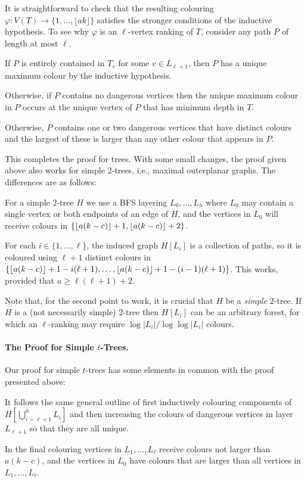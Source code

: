 \documentclass[kpfonts]{patmorin}
\theoremstyle{named}
\begin{document}
It is straightforward to check that the resulting colouring $\varphi:V(T)\to\{1,\ldots,\lfloor ak\rfloor\}$ satisfies the stronger conditions of the inductive hypothesis.  To see why $\varphi$ is an $\ell$-vertex ranking of $T$, consider any path $P$ of length at most $\ell$.
\begin{compactitem}
  \item If $P$ is entirely contained in $T_v$ for some $v\in L_{\ell+1}$, then $P$ has a unique maximum colour by the inductive hypothesis.

  \item Otherwise, if $P$ contains no dangerous vertices then the unique maximum colour in $P$ occurs at the unique vertex of $P$ that has minimum depth in $T$.

  \item Otherwise, $P$ contains one or two dangerous vertices that have distinct colours and the largest of these is larger than any other colour that appears in $P$.
\end{compactitem}
This completes the proof for trees.  With some small changes, the proof given above also works for simple $2$-trees, i.e., maximal outerplanar graphs.  The differences are as follows:
\begin{compactitem}
    \item For a simple $2$-tree $H$ we use a BFS layering $L_0,\ldots,L_h$ where $L_0$ may contain a single vertex or both endpoints of an edge of $H$, and the  vertices in $L_0$ will receive colours in $\{{\lfloor a(k-c) \rfloor}+1,{\lfloor a(k-c) \rfloor}+2\}$.

    \item For each $i\in\{1,\ldots,\ell\}$, the induced graph $H[L_i]$ is a collection of paths, so it is coloured using $\ell+1$ distinct colours in $\{{\lfloor a(k-c) \rfloor}+1-i(\ell+1),\ldots,{\lfloor a(k-c) \rfloor}+1-(i-1)(\ell+1)\}$.  This works, provided that $a\ge\ell(\ell+1) + 2$.
\end{compactitem}
Note that, for the second point to work, it is crucial that $H$ be a \emph{simple} $2$-tree.  If $H$ is a (not necessarily simple) $2$-tree then $H[L_i]$ can be an arbitrary forest, for which an $\ell$-ranking may require $\log|L_i|/\log\log|L_i|$ colours.

\paragraph{The Proof for Simple $t$-Trees.}

Our proof for simple $t$-trees has some elements in common with the proof presented above:
\begin{compactitem}
  \item It follows the same general outline of first inductively colouring components of $H[\bigcup_{i=\ell+1}^{h} L_i]$ and then increasing the colours of dangerous vertices in layer $L_{\ell+1}$ so that they are all unique.

  \item In the final colouring vertices in $L_1,\ldots,L_\ell$ receive colours not larger than $a(k-c)$, and the vertices in $L_0$ have colours that are larger than all vertices in $L_1,\ldots,L_\ell$.
\end{compactitem}
\end{document}
